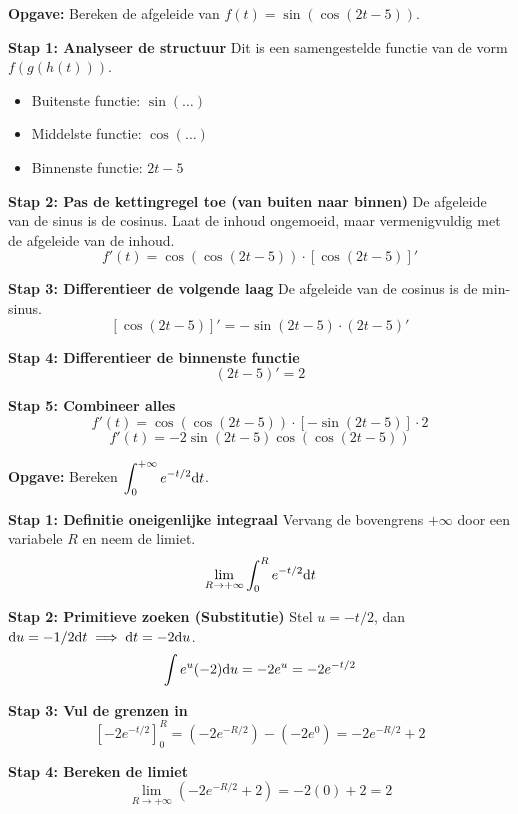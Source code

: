 \begin{oefenblok}
\textbf{Opgave:} Bereken de afgeleide van $f(t) = \sin(\cos(2t - 5))$.

\textbf{Stap 1: Analyseer de structuur}
Dit is een samengestelde functie van de vorm $f(g(h(t)))$.
\begin{itemize}
    \item Buitenste functie: $\sin(\dots)$
    \item Middelste functie: $\cos(\dots)$
    \item Binnenste functie: $2t - 5$
\end{itemize}

\textbf{Stap 2: Pas de kettingregel toe (van buiten naar binnen)}
De afgeleide van de sinus is de cosinus. Laat de inhoud ongemoeid, maar vermenigvuldig met de afgeleide van de inhoud.
\[ f'(t) = \cos(\cos(2t - 5)) \cdot [\cos(2t - 5)]' \]

\textbf{Stap 3: Differentieer de volgende laag}
De afgeleide van de cosinus is de min-sinus.
\[ [\cos(2t - 5)]' = -\sin(2t - 5) \cdot (2t - 5)' \]

\textbf{Stap 4: Differentieer de binnenste functie}
\[ (2t - 5)' = 2 \]

\textbf{Stap 5: Combineer alles}
\[ f'(t) = \cos(\cos(2t - 5)) \cdot [-\sin(2t - 5)] \cdot 2 \]
\[ f'(t) = -2 \sin(2t - 5) \cos(\cos(2t - 5)) \]
\end{oefenblok}

\begin{oefenblok}
\textbf{Opgave:} Bereken $\displaystyle \int_0^{+\infty} e^{-t/2} \mathrm{d} t$.

\textbf{Stap 1: Definitie oneigenlijke integraal}
Vervang de bovengrens $+\infty$ door een variabele $R$ en neem de limiet.
\[ \lim_{R \to +\infty} \int_0^R e^{-t/2} \mathrm{d} t \]

\textbf{Stap 2: Primitieve zoeken (Substitutie)}
Stel $u = -t/2$, dan $\mathrm{d} u = -1/2 \mathrm{d} t \implies \mathrm{d} t = -2 \mathrm{d} u$.
\[ \int e^u (-2) \mathrm{d} u = -2e^u = -2e^{-t/2} \]

\textbf{Stap 3: Vul de grenzen in}
\[ \left[ -2e^{-t/2} \right]_0^R = (-2e^{-R/2}) - (-2e^0) = -2e^{-R/2} + 2 \]

\textbf{Stap 4: Bereken de limiet}
\[ \lim_{R \to +\infty} (-2e^{-R/2} + 2) = -2(0) + 2 = 2 \]
\end{oefenblok}

